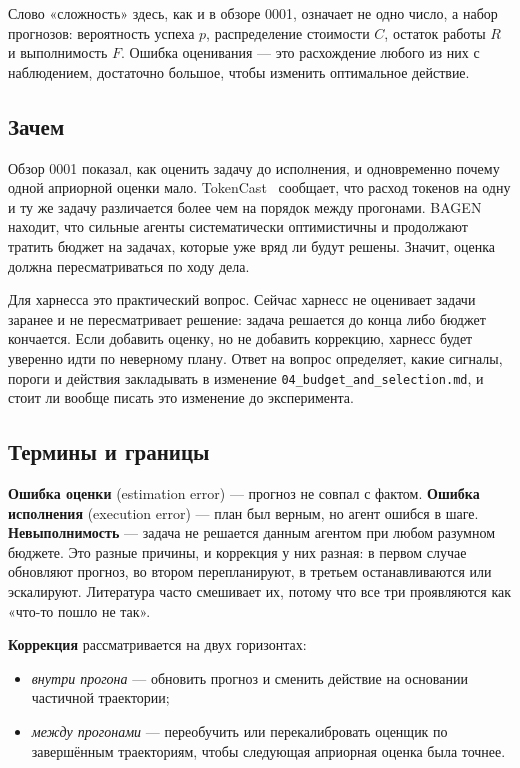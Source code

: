 \documentclass[11pt,a4paper]{article}
\begin{document}
Слово «сложность» здесь, как и в обзоре 0001, означает не одно число, а
набор прогнозов: вероятность успеха $p$, распределение стоимости $C$,
остаток работы $R$ и выполнимость $F$. Ошибка оценивания — это
расхождение любого из них с наблюдением, достаточно большое, чтобы
изменить оптимальное действие.

\subsection{Зачем}

Обзор 0001 показал, как оценить задачу до исполнения, и одновременно
почему одной априорной оценки мало. TokenCast~\cite{ouyang2026tokencast}
сообщает, что расход токенов на одну и ту же задачу различается более чем
на порядок между прогонами. BAGEN~\cite{lin2026bagen} находит, что
сильные агенты систематически оптимистичны и продолжают тратить бюджет на
задачах, которые уже вряд ли будут решены. Значит, оценка должна
пересматриваться по ходу дела.

Для харнесса это практический вопрос. Сейчас харнесс не оценивает задачи
заранее и не пересматривает решение: задача решается до конца либо бюджет
кончается. Если добавить оценку, но не добавить коррекцию, харнесс будет
уверенно идти по неверному плану. Ответ на вопрос определяет, какие
сигналы, пороги и действия закладывать в изменение
\texttt{04\_budget\_and\_selection.md}, и стоит ли вообще писать это
изменение до эксперимента.

\subsection{Термины и границы}

\textbf{Ошибка оценки} (estimation error) — прогноз не совпал с фактом.
\textbf{Ошибка исполнения} (execution error) — план был верным, но агент
ошибся в шаге. \textbf{Невыполнимость} — задача не решается данным агентом
при любом разумном бюджете. Это разные причины, и коррекция у них разная:
в первом случае обновляют прогноз, во втором перепланируют, в третьем
останавливаются или эскалируют. Литература часто смешивает их, потому что
все три проявляются как «что-то пошло не так».

\textbf{Коррекция} рассматривается на двух горизонтах:

\begin{itemize}
  \item \emph{внутри прогона} — обновить прогноз и сменить действие на
        основании частичной траектории;
  \item \emph{между прогонами} — переобучить или перекалибровать оценщик
        по завершённым траекториям, чтобы следующая априорная оценка была
        точнее.
\end{itemize}
\end{document}
